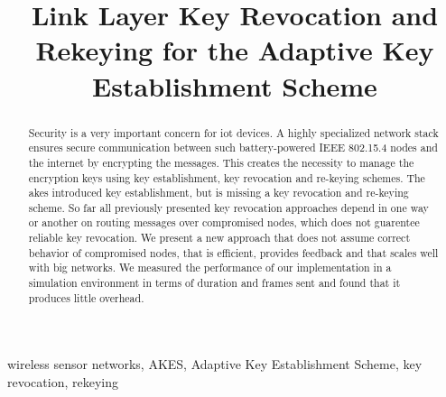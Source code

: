 \documentclass[conference]{IEEEtran}
\begin{document}
\title{Link Layer Key Revocation and Rekeying for the Adaptive Key Establishment Scheme
}

\author{
\and
{}
}

\maketitle

\begin{abstract}
Security is a very important concern for \acl{iot} devices.
A highly specialized network stack ensures secure communication between such battery-powered IEEE 802.15.4 nodes and the internet by encrypting the messages.
This creates the necessity to manage the encryption keys using key establishment, key revocation and re-keying schemes.
The \acl{akes} introduced key establishment, but is missing a key revocation and re-keying scheme. 
So far all previously presented key revocation approaches depend in one way or another on routing messages over compromised nodes, which does not guarentee reliable key revocation.
We present a new approach that does not assume correct behavior of compromised nodes, that is efficient, provides feedback and that scales well with big networks.
We measured the performance of our implementation in a simulation environment in terms of duration and frames sent and found that it produces little overhead.
\end{abstract}

\begin{IEEEkeywords}
wireless sensor networks, AKES, Adaptive Key Establishment Scheme, key revocation, rekeying
\end{IEEEkeywords}
\end{document}
